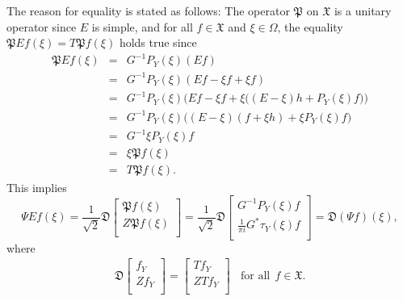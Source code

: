 \documentclass [12pt,reqno]{amsart}
\numberwithin{equation}{subsection}
\numberwithin{equation}{section}
\begin{document}
The reason for equality  is stated as follows: The operator $\mathfrak{P}$ on $\mathfrak{X}$ is a unitary operator since $E$ is simple, and for all $f \in \mathfrak{X}$ and $\xi \in \Omega$, the equality $\mathfrak{P}Ef(\xi)= T\mathfrak{P}f(\xi)$ holds true since
\begin{eqnarray*}
\mathfrak{P}Ef(\xi) &=&  G^{-1}P_{Y}(\xi)(Ef)\\
&=& G^{-1}P_{Y}(\xi)(Ef- \xi f+ \xi f)\\
&=& G^{-1}P_{Y}(\xi)\biggl(Ef- \xi f+ \xi \bigl( (E-\xi)h+P_{Y}(\xi)f \bigl) \biggl)\\
&=& G^{-1}P_{Y}(\xi)\bigl( (E- \xi)( f+ \xi h)+\xi P_{Y}(\xi)f \bigl)\\
&=& G^{-1}\xi P_{Y}(\xi)f\\
&=& \xi \mathfrak{P}f(\xi)\\
&=& T\mathfrak{P}f(\xi).
\end{eqnarray*}
This implies $$  \Psi Ef(\xi) =\frac{1}{\sqrt{2}} \mathfrak{D}                                  \begin{bmatrix} 
                       	\mathfrak{P}f(\xi)  \\
                    	Z\mathfrak{P}f(\xi) \\
                    	\end{bmatrix} =\frac{1}{\sqrt{2}}\mathfrak{D}                                  \begin{bmatrix} 
	                   G^{-1}P_{Y}(\xi)f  \\   	                      \frac{1}{\pi i} G^*\tau_{Y}(\xi)f \\
                	\end{bmatrix}	=  \mathfrak{D}                                 (\Psi f)(\xi),$$
where \begin{eqnarray} \label{Equation 3.39}
\mathfrak{D}\begin{bmatrix}
                       	f_Y  \\
                    	Zf_Y \\
                    	\end{bmatrix}   = \begin{bmatrix} 
                       	                  Tf_Y  \\
                    	                  ZTf_Y \\
                    	                   \end{bmatrix} ~~~~\mbox{for all}~~ f \in \mathfrak{X} .
\end{eqnarray}            	                   
\end{document}

